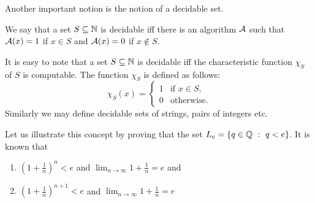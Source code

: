 Another important notion is the notion of a decidable set.
\begin{definition}
    We say that a set $S \subseteq \mathbb{N}$ is decidable iff there is
    an algorithm $\mathcal{A}$ such that
    $\mathcal{A}(x) = 1$ if $x \in S$ and $\mathcal{A}(x) = 0$ if
    $x \notin S$.
\end{definition}
It is easy to note that a set $S \subseteq \mathbb{N}$ is decidable iff the
characteristic function $\chi_S$ of $S$ is computable.
The function $\chi_S$ is defined as follows:
\[
    \chi_S(x) =
    \begin{cases}
        1 & \text{if } x \in S, \\
        0 & \text{otherwise}.
    \end{cases}
\]
Similarly we may define decidable sets of strings, pairs of integers etc.

Let us illustrate this concept by proving that the set
$L_e = \set[q < e]{q \in \Q}$. It is known that
\begin{enumerate}
    \item $(1 + \frac{1}{n})^n < e$ and
        $\lim_{n \to \infty} 1 + \frac{1}{n} = e$ and
    \item $(1 + \frac{1}{n})^{n + 1} < e$ and
        $\lim_{n \to \infty} 1 + \frac{1}{n} = e$
\end{enumerate}
